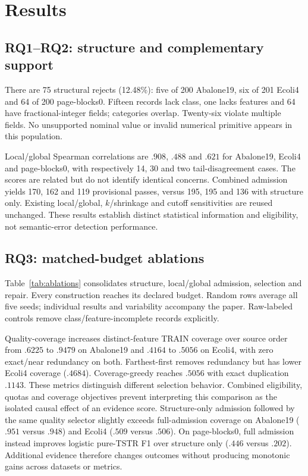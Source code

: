 \section{Results}
\subsection{RQ1--RQ2: structure and complementary support}
There are 75 structural rejects (12.48\%): five of 200 Abalone19, six of 201 Ecoli4 and 64 of 200 page-blocks0. Fifteen records lack class, one lacks features and 64 have fractional-integer fields; categories overlap. Twenty-six violate multiple fields. No unsupported nominal value or invalid numerical primitive appears in this population.

Local/global Spearman correlations are $.908$, $.488$ and $.621$ for Abalone19, Ecoli4 and page-blocks0, with respectively 14, 30 and two tail-disagreement cases. The scores are related but do not identify identical concerns. Combined admission yields 170, 162 and 119 provisional passes, versus 195, 195 and 136 with structure only. Existing local/global, $k$/shrinkage and cutoff sensitivities are reused unchanged. These results establish distinct statistical information and eligibility, not semantic-error detection performance.

\subsection{RQ3: matched-budget ablations}
\begingroup\scriptsize\endgroup
Table~\ref{tab:ablations} consolidates structure, local/global admission, selection and repair. Every construction reaches its declared budget. Random rows average all five seeds; individual results and variability accompany the paper. Raw-labeled controls remove class/feature-incomplete records explicitly.

Quality-coverage increases distinct-feature TRAIN coverage over source order from $.6225$ to $.9479$ on Abalone19 and $.4164$ to $.5056$ on Ecoli4, with zero exact/near redundancy on both. Farthest-first removes redundancy but has lower Ecoli4 coverage ($.4684$). Coverage-greedy reaches $.5056$ with exact duplication $.1143$. These metrics distinguish different selection behavior. Combined eligibility, quotas and coverage objectives prevent interpreting this comparison as the isolated causal effect of an evidence score.
Structure-only admission followed by the same quality selector slightly exceeds full-admission coverage on Abalone19 ($.951$ versus $.948$) and Ecoli4 ($.509$ versus $.506$). On page-blocks0, full admission instead improves logistic pure-TSTR F1 over structure only ($.446$ versus $.202$). Additional evidence therefore changes outcomes without producing monotonic gains across datasets or metrics.

